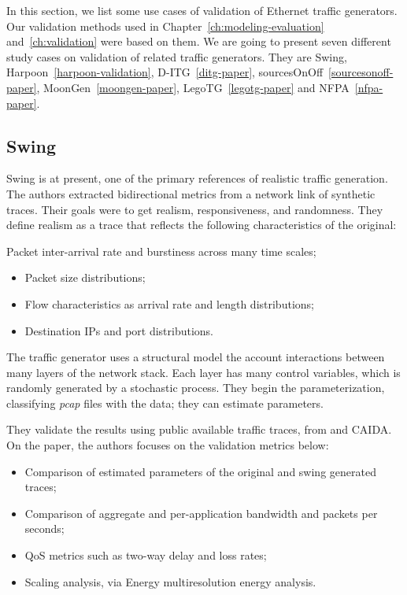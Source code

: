 In this section, we list some use cases of validation of Ethernet traffic generators. Our validation methods used in Chapter~\ref{ch:modeling-evaluation} and~\ref{ch:validation} were based on them. We are going to present seven different study cases on validation of related traffic generators. They are Swing,   Harpoon~\ref{harpoon-validation}, D-ITG~\ref{ditg-paper}, sourcesOnOff~\ref{sourcesonoff-paper}, MoonGen~\ref{moongen-paper}, LegoTG~\ref{legotg-paper} and NFPA~\ref{nfpa-paper}.

\subsection{Swing}

Swing\cite{swing-paper} is at present, one of the primary references of realistic traffic generation. The authors extracted bidirectional metrics from a network link of synthetic traces. Their goals were to get realism, responsiveness, and randomness. They define realism as a trace that reflects the following characteristics of the original:

Packet inter-arrival rate and burstiness across many time scales;
\begin{itemize}
\item Packet size distributions;
\item Flow characteristics as arrival rate and length distributions;
\item Destination IPs and port distributions.
\end{itemize}

The traffic generator uses a structural model the account interactions between many layers of the network stack. Each layer has many control variables, which is randomly generated by a stochastic process. They begin the parameterization, classifying \cite{web-libpcap} \textit{pcap} files with the data; they can estimate parameters.

They validate the results using public available traffic traces, from \cite{web-mawi} and CAIDA\cite{web-caida}. On the paper, the authors focuses on  the validation metrics below:

\begin{itemize}
\item Comparison of estimated parameters of the original and swing generated traces;
\item Comparison of aggregate and per-application bandwidth and packets per seconds;
\item QoS metrics such as two-way delay and loss rates;
\item Scaling analysis, via Energy multiresolution energy analysis.
\end{itemize}


